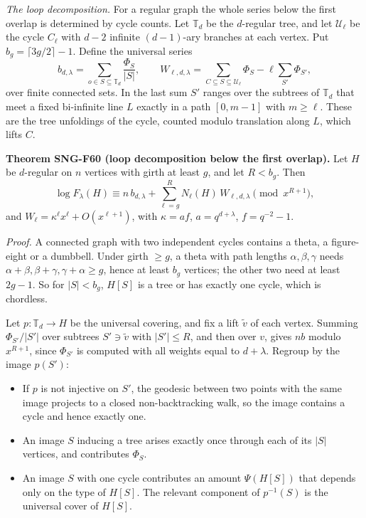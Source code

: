 \documentclass[
  11pt,
  a4paper,
]{report}
\providecommand{\tightlist}{%
  \setlength{\itemsep}{0pt}\setlength{\parskip}{0pt}}
\begin{document}
\emph{The loop decomposition.} For a regular graph the whole series
below the first overlap is determined by cycle counts. Let
\(\mathbb T_d\) be the \(d\)-regular tree, and let \(\mathcal U_\ell\)
be the cycle \(C_\ell\) with \(d-2\) infinite \((d-1)\)-ary branches at
each vertex. Put \(b_g=\lceil3g/2\rceil-1\). Define the universal series
\[
b_{d,\lambda}=\sum_{o\in S\subseteq\mathbb T_d}\frac{\Phi_S}{|S|},\qquad
W_{\ell,d,\lambda}=\sum_{C\subseteq S\subseteq\mathcal U_\ell}\Phi_S-\ell\sum_{S'}\Phi_{S'},
\] over finite connected sets. In the last sum \(S'\) ranges over the
subtrees of \(\mathbb T_d\) that meet a fixed bi-infinite line \(L\)
exactly in a path \([0,m-1]\) with \(m\ge\ell\). These are the tree
unfoldings of the cycle, counted modulo translation along \(L\), which
lifts \(C\).

\textbf{Theorem SNG-F60 (loop decomposition below the first overlap).}
Let \(H\) be \(d\)-regular on \(n\) vertices with girth at least \(g\),
and let \(R<b_g\). Then \[
\log F_\lambda(H)\equiv n\,b_{d,\lambda}+\sum_{\ell=g}^{R}N_\ell(H)\,W_{\ell,d,\lambda}\pmod{x^{R+1}},
\] and \(W_\ell=\kappa^\ell x^\ell+O(x^{\ell+1})\), with \(\kappa=af\),
\(a=q^{d+\lambda}\), \(f=q^{-2}-1\).

\emph{Proof.} A connected graph with two independent cycles contains a
theta, a figure-eight or a dumbbell. Under girth \(\ge g\), a theta with
path lengths \(\alpha,\beta,\gamma\) needs
\(\alpha+\beta,\beta+\gamma,\gamma+\alpha\ge g\), hence at least \(b_g\)
vertices; the other two need at least \(2g-1\). So for \(|S|<b_g\),
\(H[S]\) is a tree or has exactly one cycle, which is chordless.

Let \(p:\mathbb T_d\to H\) be the universal covering, and fix a lift
\(\tilde v\) of each vertex. Summing \(\Phi_{S'}/|S'|\) over subtrees
\(S'\ni\tilde v\) with \(|S'|\le R\), and then over \(v\), gives \(nb\)
modulo \(x^{R+1}\), since \(\Phi_{S'}\) is computed with all weights
equal to \(d+\lambda\). Regroup by the image \(p(S')\):

\begin{itemize}
\tightlist
\item
  If \(p\) is not injective on \(S'\), the geodesic between two points
  with the same image projects to a closed non-backtracking walk, so the
  image contains a cycle and hence exactly one.
\item
  An image \(S\) inducing a tree arises exactly once through each of its
  \(|S|\) vertices, and contributes \(\Phi_S\).
\item
  An image \(S\) with one cycle contributes an amount \(\Psi(H[S])\)
  that depends only on the type of \(H[S]\). The relevant component of
  \(p^{-1}(S)\) is the universal cover of \(H[S]\).
\end{itemize}
\end{document}
